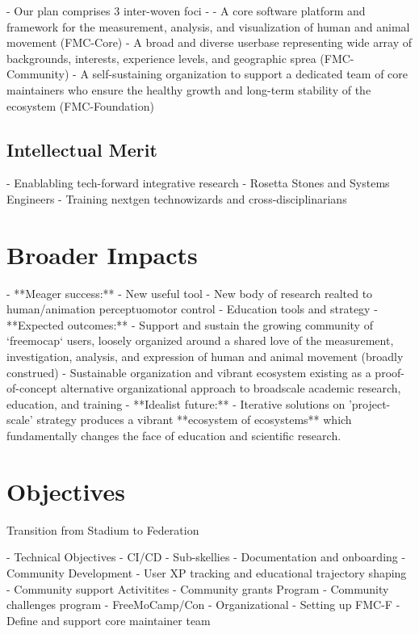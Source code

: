 \documentclass[11pt]{article}
\begin{document}

- Our plan comprises 3 inter-woven foci - 
- A core software platform and framework for the measurement, analysis, and visualization of human and animal movement (FMC-Core)
- A broad and diverse userbase representing wide array of backgrounds, interests, experience levels, and geographic sprea (FMC-Community)
- A self-sustaining organization to support a dedicated team of core maintainers who ensure the healthy growth and long-term stability of the ecosystem (FMC-Foundation)

\subsection{Intellectual Merit\label{sec:IM}}

- Enablabling tech-forward integrative research
- Rosetta Stones and Systems Engineers
- Training nextgen technowizards and cross-disciplinarians

\section{Broader Impacts\label{sec:BI}}
- **Meager success:**
  - New useful tool
  - New body of research realted to human/animation perceptuomotor control
  - Education tools and strategy
- **Expected outcomes:**
  - Support and sustain the growing community of `freemocap` users, loosely organized around a shared love of the measurement, investigation, analysis, and expression of human and animal movement (broadly construed) 
  - Sustainable organization and vibrant ecosystem existing as a proof-of-concept alternative organizational approach to broadscale academic research, education, and training
- **Idealist future:**
  - Iterative solutions on 'project-scale' strategy produces a vibrant **ecosystem of ecosystems** which fundamentally changes the face of education and scientific research.

\section{Objectives}

Transition from Stadium to Federation \cite{}


 - Technical Objectives
    - CI/CD
    - Sub-skellies
    - Documentation and onboarding
 - Community Development
    - User XP tracking and educational trajectory shaping
    - Community support Activitites
      - Community grants Program
      - Community challenges program 
      - FreeMoCamp/Con
 - Organizational 
    - Setting up FMC-F
    - Define and support core maintainer team
\end{document}
